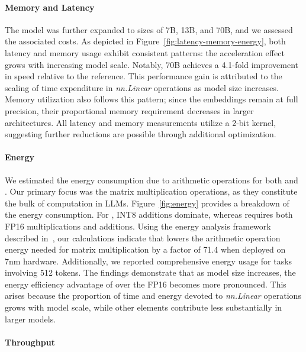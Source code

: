 \paragraph{Memory and Latency}

The model was further expanded to sizes of 7B, 13B, and 70B, and we assessed the associated costs. As depicted in Figure~\ref{fig:latency-memory-energy}, both latency and memory usage exhibit consistent patterns: the acceleration effect grows with increasing model scale. Notably,  70B achieves a 4.1-fold improvement in speed relative to the  reference. This performance gain is attributed to the scaling of time expenditure in \emph{nn.Linear} operations as model size increases. Memory utilization also follows this pattern; since the embeddings remain at full precision, their proportional memory requirement decreases in larger architectures. All latency and memory measurements utilize a 2-bit kernel, suggesting further reductions are possible through additional optimization.

\paragraph{Energy}

We estimated the energy consumption due to arithmetic operations for both  and . Our primary focus was the matrix multiplication operations, as they constitute the bulk of computation in LLMs. Figure~\ref{fig:energy} provides a breakdown of the energy consumption. For , INT8 additions dominate, whereas  requires both FP16 multiplications and additions. Using the energy analysis framework described in~\cite{energycost, pokebnn}, our calculations indicate that  lowers the arithmetic operation energy needed for matrix multiplication by a factor of 71.4 when deployed on 7nm hardware. Additionally, we reported comprehensive energy usage for tasks involving 512 tokens. The findings demonstrate that as model size increases, the energy efficiency advantage of  over the FP16  becomes more pronounced. This arises because the proportion of time and energy devoted to \emph{nn.Linear} operations grows with model scale, while other elements contribute less substantially in larger models.

\paragraph{Throughput}

